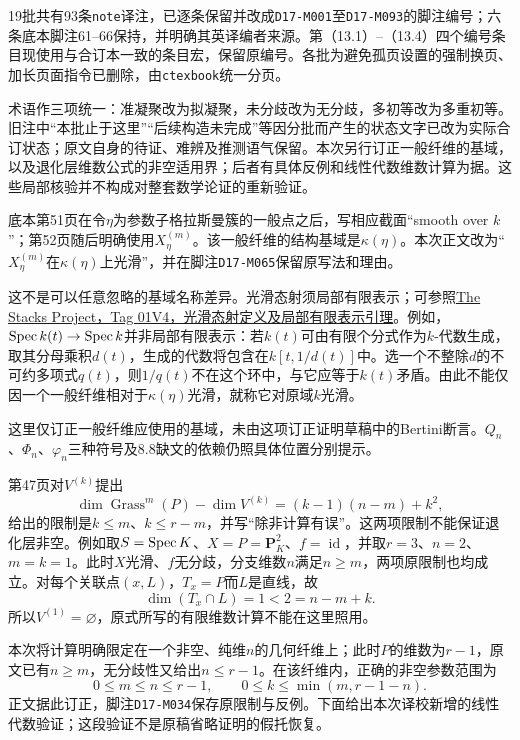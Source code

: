 19批共有93条\texttt{note}译注，已逐条保留并改成\texttt{D17-M001}至\texttt{D17-M093}的脚注编号；六条底本脚注61--66保持，并明确其英译编者来源。第（13.1）--（13.4）四个编号条目现使用与合订本一致的条目宏，保留原编号。各批为避免孤页设置的强制换页、加长页面指令已删除，由\texttt{ctexbook}统一分页。

术语作三项统一：准凝聚改为拟凝聚，未分歧改为无分歧，多初等改为多重初等。旧注中“本批止于这里”“后续构造未完成”等因分批而产生的状态文字已改为实际合订状态；原文自身的待证、难辨及推测语气保留。本次另行订正一般纤维的基域，以及退化层维数公式的非空适用界；后者有具体反例和线性代数维数计算为据。这些局部核验并不构成对整套数学论证的重新验证。

底本第51页在令$\eta$为参数子格拉斯曼簇的一般点之后，写相应截面“smooth over $k$”；第52页随后明确使用$X^{(m)}_\eta$。该一般纤维的结构基域是$\kappa(\eta)$。本次正文改为“$X^{(m)}_\eta$在$\kappa(\eta)$上光滑”，并在脚注\texttt{D17-M065}保留原写法和理由。

这不是可以任意忽略的基域名称差异。光滑态射须局部有限表示；可参照\href{https://stacks.math.columbia.edu/tag/01V4}{The Stacks Project，Tag 01V4，光滑态射定义及局部有限表示引理}。例如，$\operatorname{Spec} k(t)\to\operatorname{Spec} k$并非局部有限表示：若$k(t)$可由有限个分式作为$k$-代数生成，取其分母乘积$d(t)$，生成的代数将包含在$k[t,1/d(t)]$中。选一个不整除$d$的不可约多项式$q(t)$，则$1/q(t)$不在这个环中，与它应等于$k(t)$矛盾。由此不能仅因一个一般纤维相对于$\kappa(\eta)$光滑，就称它对原域$k$光滑。

这里仅订正一般纤维应使用的基域，未由这项订正证明草稿中的Bertini断言。$Q_n$、$\Phi_n$、$\varphi_n$三种符号及8.8缺文的依赖仍照具体位置分别提示。

第47页对$V^{(k)}$提出
\[
\dim\operatorname{Grass}^{m}(P)-\dim V^{(k)}=(k-1)(n-m)+k^2,
\]
给出的限制是$k\leq m$、$k\leq r-m$，并写“除非计算有误”。这两项限制不能保证退化层非空。例如取$S=\operatorname{Spec} K$、$X=P=\mathbf P^2_K$、$f=\operatorname{id}$，并取$r=3$、$n=2$、$m=k=1$。此时$X$光滑、$f$无分歧，分支维数$n$满足$n\geq m$，两项原限制也均成立。对每个关联点$(x,L)$，$T_x=P$而$L$是直线，故
\[
\dim(T_x\cap L)=1<2=n-m+k.
\]
所以$V^{(1)}=\varnothing$，原式所写的有限维数计算不能在这里照用。

本次将计算明确限定在一个非空、纯维$n$的几何纤维上；此时$P$的维数为$r-1$，原文已有$n\geq m$，无分歧性又给出$n\leq r-1$。在该纤维内，正确的非空参数范围为
\[
0\leq m\leq n\leq r-1,\qquad
0\leq k\leq\min(m,r-1-n).
\]
正文据此订正，脚注\texttt{D17-M034}保存原限制与反例。下面给出本次译校新增的线性代数验证；这段验证不是原稿省略证明的假托恢复。

